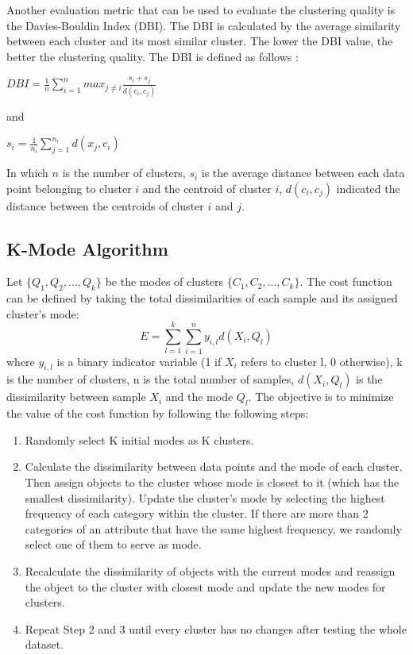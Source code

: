 \documentclass[12pt]{article}
\begin{document}
\noindent Another evaluation metric that can be used to evaluate
the clustering quality is the Davies-Bouldin Index (DBI). The DBI
is calculated by the average similarity between each cluster and its
most similar cluster. The lower the DBI value, the better the clustering
quality. The DBI is defined as follows \citep{HOSEN2023688}:
\begin{center}

$ DBI = \frac{1}{n} \sum_{i=1}^{n} max_{j \neq i} \frac{s_i + s_j}{d(c_i,c_j)}$

\end{center}
and
\begin{center}
$s_i = \frac{1}{n_i} \sum_{j=1}^{n_i} d(x_j,c_i)$
\end{center}
\noindent In which $n$ is the number of clusters, $s_i$ is the average distance between
each data point belonging to cluster $i$ and the centroid of cluster $i$, 
$d(c_i,c_j)$ indicated the distance between the centroids of cluster $i$ and
$j$.

\subsection{K-Mode Algorithm\citep{huang1998extensions}}
Let $\{Q_1,Q_2,...,Q_k\}$ be the modes of clusters $\{C_1,C_2,...,C_k\}$. The cost function can be defined by taking the total dissimilarities of each sample and its assigned cluster's mode: 
$$E = \sum_{l=1}^{k}\sum_{i=1}^{n}y_{i,l}d(X_i,Q_l)$$ 
where $y_{i,l}$ is a binary indicator variable (1 if $X_i$ refers to cluster l, 0 otherwise), k is the number of clusters, n is the total number of samples, $d(X_i,Q_l)$ is the dissimilarity between sample $X_i$ and the mode $Q_l$. The objective is to minimize the value of the cost function by following the following steps: 

\begin{enumerate}
    \item Randomly select K initial modes as K clusters.
    
    \item Calculate the dissimilarity between data points and the mode of each cluster. Then assign objects to the cluster whose mode is closest to it (which has the smallest dissimilarity). Update the cluster’s mode by selecting the highest frequency of each category within the cluster. If there are more than 2 categories of an attribute that have the same highest frequency, we randomly select one of them to serve as mode.
    
    \item Recalculate the dissimilarity of objects with the current modes and reassign the object to the cluster with closest mode and update the new modes for clusters.
    
    \item Repeat Step 2 and 3 until every cluster has no changes after testing the whole dataset.
\end{enumerate}
\end{document}

